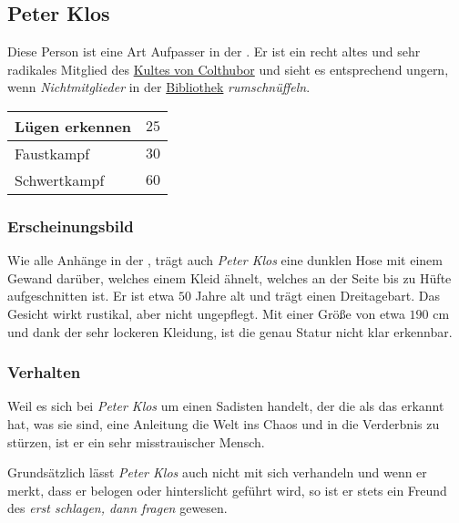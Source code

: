 \subsection{Peter Klos}
    \label{pers:peter-klos}
    \begin{minipage}{0.7\textwidth}
        Diese Person ist eine Art Aufpasser in der . Er ist ein recht altes und sehr radikales Mitglied des \hyperref[sons:kult-von-colthubor]{Kultes von Colthubor} und sieht es entsprechend ungern, wenn \emph{Nichtmitglieder} in der \hyperref[locs:bibliothek-der-alten-schriften]{Bibliothek} \emph{rumschnüffeln}.
    \end{minipage}
    \begin{minipage}{0.3\textwidth}
        \centering
        \begin{tabular}{| l | l |}
            \hline
            Lügen erkennen & $25$ \\ \hline
            Faustkampf & $30$ \\ \hline
            Schwertkampf & $60$ \\ \hline
        \end{tabular}
    \end{minipage}

    \subsubsection{Erscheinungsbild}
        Wie alle Anhänge in der , trägt auch \emph{Peter Klos} eine dunklen Hose mit einem Gewand darüber, welches einem Kleid ähnelt, welches an der Seite bis zu Hüfte aufgeschnitten ist. Er ist etwa $50$ Jahre alt und trägt einen Dreitagebart. Das Gesicht wirkt rustikal, aber nicht ungepflegt. Mit einer Größe von etwa $190$ cm und dank der sehr lockeren Kleidung, ist die genau Statur nicht klar erkennbar.

    \subsubsection{Verhalten}
        Weil es sich bei \emph{Peter Klos} um einen Sadisten handelt, der die  als das erkannt hat, was sie sind, eine Anleitung die Welt ins Chaos und in die Verderbnis zu stürzen, ist er ein sehr misstrauischer Mensch.

        Grundsätzlich lässt \emph{Peter Klos} auch nicht mit sich verhandeln und wenn er merkt, dass er belogen oder hinterslicht geführt wird, so ist er stets ein Freund des \emph{erst schlagen, dann fragen} gewesen.

